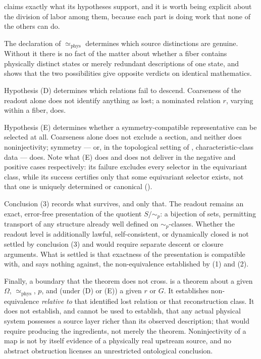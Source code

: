 \documentclass[11pt,reqno]{amsart}
\theoremstyle{plain}
\theoremstyle{definition}
\theoremstyle{remark}
\newcommand{\phe}{\simeq_{\mathrm{phys}}}
\newcommand{\Om}{\Omega}
\begin{document}
 claims exactly what its hypotheses support, and it is worth being explicit about the division of labor among them, because each part is doing work that none of the others can do.

The declaration of $\phe$ determines which source distinctions are genuine. Without it there is no fact of the matter about whether a fiber contains physically distinct states or merely redundant descriptions of one state, and  shows that the two possibilities give opposite verdicts on identical mathematics.

Hypothesis (D) determines which relations fail to descend. Coarseness of the readout alone does not identify anything as lost; a nominated relation $r$, varying within a fiber, does.

Hypothesis (E) determines whether a symmetry-compatible representative can be selected at all. Coarseness alone does not exclude a section, and neither does noninjectivity; symmetry --- or, in the topological setting of , characteristic-class data --- does. Note what (E) does and does not deliver in the negative and positive cases respectively: its failure excludes every selector in the equivariant class, while its success certifies only that some equivariant selector exists, not that one is uniquely determined or canonical ().

Conclusion (3) records what survives, and only that. The readout remains an exact, error-free presentation of the quotient $S/\!\sim_{p}$: a bijection of sets, permitting transport of any structure already well defined on $\sim_{p}$-classes. Whether the readout level is additionally lawful, self-consistent, or dynamically closed is not settled by conclusion (3) and would require separate descent or closure arguments. What is settled is that exactness of the presentation is compatible with, and says nothing against, the non-equivalence established by (1) and (2).

Finally, a boundary that the theorem does not cross.  is a theorem about a given $\Om$, $\phe$, $p$, and (under (D) or (E)) a given $r$ or $G$. It establishes non-equivalence \emph{relative to} that identified lost relation or that reconstruction class. It does not establish, and cannot be used to establish, that any actual physical system possesses a source layer richer than its observed description; that would require producing the ingredients, not merely the theorem. Noninjectivity of a map is not by itself evidence of a physically real upstream source, and no abstract obstruction licenses an unrestricted ontological conclusion.
\end{document}
